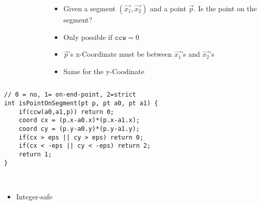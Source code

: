 \documentclass[12pt,t]{beamer}
\newcommand{\bi}{\begin{itemize}}
\newcommand{\ei}{\end{itemize}}
\begin{document}
\begin{frame}[fragile]
  \begin{columns}
    \begin{column}{0.5\textwidth}
      \begin{figure}
        \footnotesize
      \end{figure}
    \end{column}
    \begin{column}{0.55\textwidth}
      \bi
        \item Given a segment $(\vec{x_1},\vec{x_2})$ and a point $\vec p$.
        Is the point on the segment? \pause
        \item Only possible if $\texttt{ccw} = 0$
        \item $\vec{p}$'s x-Coordinate must be between $\vec{x_1}$'s and $\vec{x_2}$'s
        \item Same for the y-Coodinate
      \ei
    \end{column}
  \end{columns}
\end{frame}

\begin{frame}[fragile]
  \vspace{20pt}
  \begin{verbatim}
// 0 = no, 1= on-end-point, 2=strict
int isPointOnSegment(pt p, pt a0, pt a1) {
    if(ccw(a0,a1,p)) return 0;
    coord cx = (p.x-a0.x)*(p.x-a1.x);
    coord cy = (p.y-a0.y)*(p.y-a1.y);
    if(cx > eps || cy > eps) return 0;
    if(cx < -eps || cy < -eps) return 2;
    return 1;
}
  \end{verbatim} 
  \ \\ \pause
  \bi
 	\item Integer-safe
  \ei
\end{frame}
\end{document}
